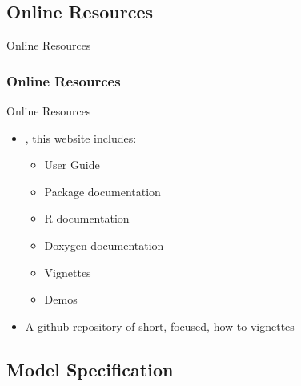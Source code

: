 \documentclass[
	11pt, %
]{beamer}
\begin{document}




\subsection{Online Resources}
\begin{frame}[fragile]{Online Resources}
  \frametitle{Online Resources}
    \begin{block}{Online Resources}
      \begin{itemize}
         \item \href{https://mrgsolve.org/}{}, this website includes:
           \begin{itemize}
           \item User Guide
           \item Package documentation
           \item R documentation
           \item Doxygen documentation
           \item Vignettes
           \item Demos
           \end{itemize}
        \item \href{https://github.com/metrumresearchgroup/mrgsolve}{}A github repository of short, focused, how-to vignettes
      \end{itemize}
    \end{block}

\end{frame}
\subsection{Model Specification}
\end{document}
